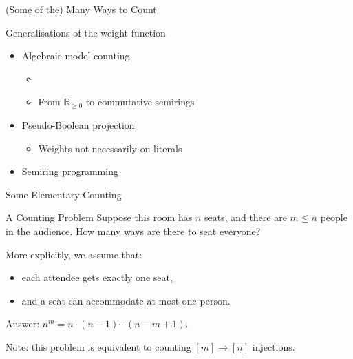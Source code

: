\documentclass{beamer}
\begin{document}
\begin{frame}[fragile]{(Some of the) Many Ways to Count}
\begin{overprint}
      \begin{block}{Generalisations of the weight function}
        \begin{itemize}
          \item Algebraic model counting
          \begin{itemize}
            \item \textcolor{gray}{\parencite{DBLP:journals/japll/KimmigBR17}}
            \item From $\mathbb{R}_{\ge 0}$ to commutative semirings
          \end{itemize}
          \item Pseudo-Boolean projection~\textcolor{gray}{\parencite{DBLP:conf/sat/DilkasB21}}
          \begin{itemize}
            \item Weights not necessarily on literals
          \end{itemize}
          \item Semiring programming~
        \end{itemize}
      \end{block}
    \end{overprint}
\end{frame}



\begin{frame}{Some Elementary Counting}
  \begin{exampleblock}{A Counting Problem}
    Suppose this room has \alert{$n$} seats, and there are \alert{$m \le n$}
    people in the audience. How many ways are there to seat everyone?
  \end{exampleblock}

  \pause
  More explicitly, we assume that:
  \begin{itemize}
  \item each attendee gets exactly one seat,
  \item and a seat can accommodate at most one person.
  \end{itemize}

  \pause
  \alert{Answer:} $n^{\underline{m}} = n \cdot (n-1)\cdots(n-m+1)$.

  Note: this problem is equivalent to counting \alert{$[m] \to [n]$} injections.

\end{frame}
\end{document}
